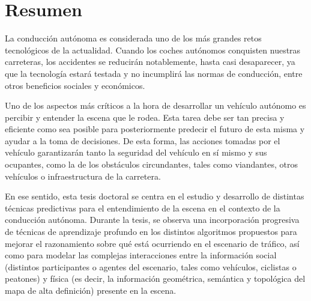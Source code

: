 %
%
%
% 
%
%
%
%

\chapter*{Resumen}
\label{cha:resumen}


La conducción autónoma es considerada uno de los más grandes retos tecnológicos de la actualidad. Cuando los coches autónomos conquisten nuestras carreteras, los accidentes se reducirán notablemente, hasta casi desaparecer, ya que la tecnología estará testada y no incumplirá las normas de conducción, entre otros beneficios sociales y económicos.

Uno de los aspectos más críticos a la hora de desarrollar un vehículo autónomo es percibir y entender la escena que le rodea. Esta tarea debe ser tan precisa y eficiente como sea posible para posteriormente predecir el futuro de esta misma y ayudar a la toma de decisiones. De esta forma, las acciones tomadas por el vehículo garantizarán tanto la seguridad del vehículo en sí mismo y sus ocupantes, como la de los obstáculos circundantes, tales como viandantes, otros vehículos o infraestructura de la carretera.

En ese sentido, esta tesis doctoral se centra en el estudio y desarrollo de distintas técnicas predictivas para el entendimiento de la escena en el contexto de la conducción autónoma. Durante la tesis, se observa una incorporación progresiva de técnicas de aprendizaje profundo en los distintos algoritmos propuestos para mejorar el razonamiento sobre qué está ocurriendo en el escenario de tráfico, así como para modelar las complejas interacciones entre la información social (distintos participantes o agentes del escenario, tales como vehículos, ciclistas o peatones) y física (es decir, la información geométrica, semántica y topológica del mapa de alta definición) presente en la escena. 

